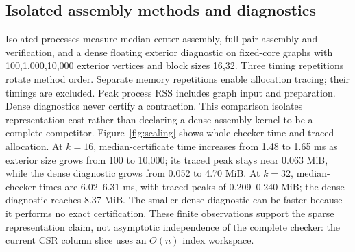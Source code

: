 \documentclass[sigconf,anonymous,review]{acmart}
\newcommand{\1}{\mathbf{1}}
\begin{document}
\subsection{Isolated assembly methods and diagnostics}
Isolated processes measure median-center assembly, full-pair assembly and
verification, and a dense floating exterior diagnostic on fixed-core graphs
with 100,1,000,10,000 exterior vertices and block sizes 16,32. Three timing
repetitions rotate method order. Separate memory repetitions enable allocation
tracing; their timings are excluded. Peak process RSS includes graph input and
preparation. Dense diagnostics never certify a contraction. This comparison
isolates representation cost rather than declaring a dense assembly kernel to
be a complete competitor.
Figure~\ref{fig:scaling} shows whole-checker time and traced allocation.
At $k=16$, median-certificate time increases from 1.48 to 1.65 ms as exterior
size grows from 100 to 10,000; its traced peak stays near 0.063 MiB, while the
dense diagnostic grows from 0.052 to 4.70 MiB. At $k=32$, median-checker
times are 6.02--6.31 ms, with traced peaks of 0.209--0.240 MiB; the dense
diagnostic reaches 8.37 MiB. The smaller dense diagnostic can be faster
because it performs no exact certification. These finite observations support
the sparse representation claim, not asymptotic independence of the complete
checker: the current CSR column slice uses an $O(n)$ index workspace.
\end{document}
